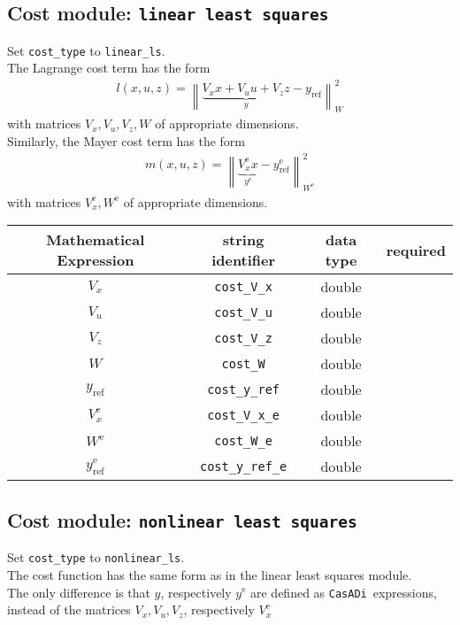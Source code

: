 \documentclass{article}
\newcommand{\code}[1]{\texttt{#1}}
\newcommand{\casadi}{\texttt{CasADi}}
\newcommand{\norm}[1]{\left\lVert#1\right\rVert}
\newcommand{\terminal}{^{\textrm{e}}}
\begin{document}
\subsection*{Cost module: \code{linear least squares}}
Set \code{cost\_type} to \code{linear\_ls}.\\
The Lagrange cost term has the form
\begin{align*}
l(x, u, z) = \norm{ \underbrace{V_x x + V_u u + V_z z}_y - y_{\textrm{ref}}}_W^2
\end{align*}
with matrices $ V_x, V_u, V_z, W $ of appropriate dimensions.\\
Similarly, the Mayer cost term has the form
\begin{align*}
m(x, u, z) = \norm{ \underbrace{V_x\terminal x}_{y\terminal} - y\terminal_{\textrm{ref}}}_{W\terminal}^2
\end{align*}
with matrices $ V\terminal_x, W\terminal $ of appropriate dimensions.
\begin{table}[h!]
	\centering
	\begin{tabular}{|c|c|c|c|}
		\toprule
		Mathematical Expression & string identifier & data type & required \\ \midrule
		$ V_x $ & \code{cost\_V\_x}    & double & \mandatory   \\ \midrule
		$ V_u $ & \code{cost\_V\_u}    & double & \mandatory   \\ \midrule
		$ V_z $ & \code{cost\_V\_z}    & double & \mandatory  \\ \midrule
		$ W $ & \code{cost\_W}    & double & \mandatory  \\ \midrule
		$ y_{\textrm{ref}} $ & \code{cost\_y\_ref}    & double & \mandatory   \\ \midrule
		$ V_x\terminal $ & \code{cost\_V\_x\_e}    & double  & \mandatory  \\ \midrule
		$ W\terminal $ & \code{cost\_W\_e}    & double & \mandatory   \\ \midrule
		$ y_{\textrm{ref}}\terminal $ & \code{cost\_y\_ref\_e}   & double & \mandatory   \\
		\bottomrule
	\end{tabular}
\end{table}

\newpage
\subsection*{Cost module: \code{nonlinear least squares}}
Set \code{cost\_type} to \code{nonlinear\_ls}.\\
The cost function has the same form as in the linear least squares module.\\
The only difference is that $ y $, respectively $ y\terminal $ are defined as \casadi~expressions, instead of the matrices $ V_x, V_u, V_z $, respectively $ V_x\terminal $
\end{document}
